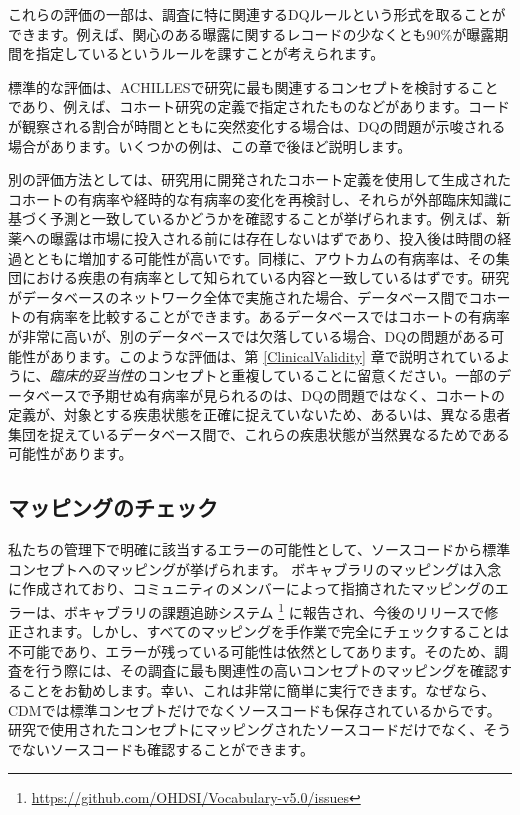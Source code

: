 \documentclass[
  11pt]{book}
\theoremstyle{definition}
\theoremstyle{definition}
\theoremstyle{definition}
\theoremstyle{definition}
\theoremstyle{remark}
\begin{document}
これらの評価の一部は、調査に特に関連するDQルールという形式を取ることができます。例えば、関心のある曝露に関するレコードの少なくとも90\%が曝露期間を指定しているというルールを課すことが考えられます。

標準的な評価は、ACHILLESで研究に最も関連するコンセプトを検討することであり、例えば、コホート研究の定義で指定されたものなどがあります。コードが観察される割合が時間とともに突然変化する場合は、DQの問題が示唆される場合があります。いくつかの例は、この章で後ほど説明します。

別の評価方法としては、研究用に開発されたコホート定義を使用して生成されたコホートの有病率や経時的な有病率の変化を再検討し、それらが外部臨床知識に基づく予測と一致しているかどうかを確認することが挙げられます。例えば、新薬への曝露は市場に投入される前には存在しないはずであり、投入後は時間の経過とともに増加する可能性が高いです。同様に、アウトカムの有病率は、その集団における疾患の有病率として知られている内容と一致しているはずです。研究がデータベースのネットワーク全体で実施された場合、データベース間でコホートの有病率を比較することができます。あるデータベースではコホートの有病率が非常に高いが、別のデータベースでは欠落している場合、DQの問題がある可能性があります。このような評価は、第 \ref{ClinicalValidity} 章で説明されているように、\emph{臨床的妥当性}のコンセプトと重複していることに留意ください。一部のデータベースで予期せぬ有病率が見られるのは、DQの問題ではなく、コホートの定義が、対象とする疾患状態を正確に捉えていないため、あるいは、異なる患者集団を捉えているデータベース間で、これらの疾患状態が当然異なるためである可能性があります。

\subsection{マッピングのチェック}\label{ux30deux30c3ux30d4ux30f3ux30b0ux306eux30c1ux30a7ux30c3ux30af}

私たちの管理下で明確に該当するエラーの可能性として、ソースコードから標準コンセプトへのマッピングが挙げられます。 ボキャブラリのマッピングは入念に作成されており、コミュニティのメンバーによって指摘されたマッピングのエラーは、ボキャブラリの課題追跡システム \footnote{\url{https://github.com/OHDSI/Vocabulary-v5.0/issues}} に報告され、今後のリリースで修正されます。しかし、すべてのマッピングを手作業で完全にチェックすることは不可能であり、エラーが残っている可能性は依然としてあります。そのため、調査を行う際には、その調査に最も関連性の高いコンセプトのマッピングを確認することをお勧めします。幸い、これは非常に簡単に実行できます。なぜなら、CDMでは標準コンセプトだけでなくソースコードも保存されているからです。研究で使用されたコンセプトにマッピングされたソースコードだけでなく、そうでないソースコードも確認することができます。
\end{document}
